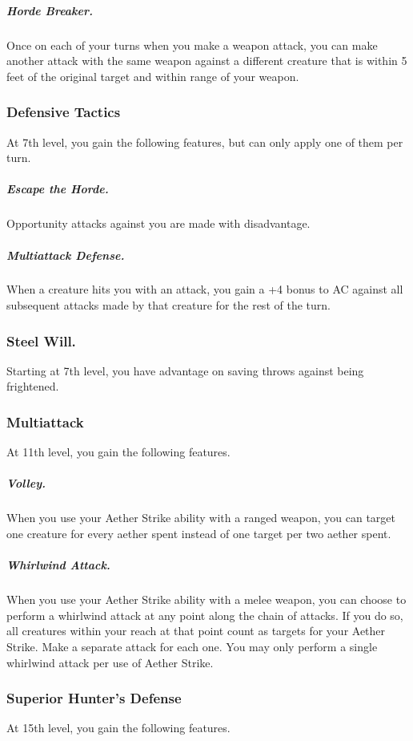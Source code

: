 \subparagraph*{Horde Breaker.} Once on each of your turns when you make a weapon attack, you can make another attack with the same weapon against a different creature that is within 5 feet of the original target and within range of your weapon.

\subsubsection{Defensive Tactics}

At 7th level, you gain the following features, but can only apply one of them per turn.

\subparagraph*{Escape the Horde.} Opportunity attacks against you are made with disadvantage.

\subparagraph*{Multiattack Defense.} When a creature hits you with an attack, you gain a +4 bonus to AC against all subsequent attacks made by that creature for the rest of the turn.

\subsubsection{Steel Will.} Starting at 7th level, you have advantage on saving throws against being frightened.

\subsubsection{Multiattack}

At 11th level, you gain the following features.

\subparagraph*{Volley.} When you use your Aether Strike ability with a ranged weapon, you can target one creature for every aether spent instead of one target per two aether spent.

\subparagraph*{Whirlwind Attack.} When you use your Aether Strike ability with a melee weapon, you can choose to perform a whirlwind attack at any point along the chain of attacks. If you do so, all creatures within your reach at that point count as targets for your Aether Strike. Make a separate attack for each one. You may only perform a single whirlwind attack per use of Aether Strike.

\subsubsection{Superior Hunter's Defense}

At 15th level, you gain the following features.

